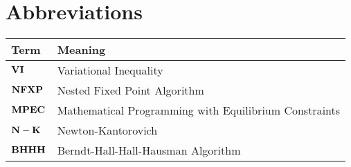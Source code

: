 

\section*{Abbreviations} %
\thispagestyle{plain} %

\phantom{This text will be invisible} 
\hspace{20cm}



\begin{table}[H]
	\centering
	\renewcommand{\arraystretch}{1.2}%
	\begin{tabular}{@{}ll@{}}
		\toprule
	Term\phantom{space}	& Meaning \\ \midrule
		$\bold{VI}$	& Variational Inequality \\
		$\bold{NFXP}$	& Nested Fixed Point Algorithm \\
		$\bold{MPEC}$	& Mathematical Programming with Equilibrium Constraints \\
		$\bold{N-K}$	& Newton-Kantorovich \\
		$\bold{BHHH}$	& Berndt-Hall-Hall-Hausman Algorithm \\
 \bottomrule
	\end{tabular}
\end{table}